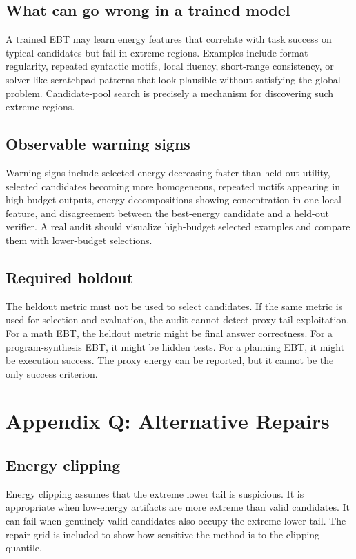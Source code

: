 \documentclass{article}
\begin{document}
\subsection{What can go wrong in a trained model}

A trained EBT may learn energy features that correlate with task success on
typical candidates but fail in extreme regions. Examples include format
regularity, repeated syntactic motifs, local fluency, short-range consistency,
or solver-like scratchpad patterns that look plausible without satisfying the
global problem. Candidate-pool search is precisely a mechanism for discovering
such extreme regions.

\subsection{Observable warning signs}

Warning signs include selected energy decreasing faster than held-out utility,
selected candidates becoming more homogeneous, repeated motifs appearing in
high-budget outputs, energy decompositions showing concentration in one local
feature, and disagreement between the best-energy candidate and a held-out
verifier. A real audit should visualize high-budget selected examples and
compare them with lower-budget selections.

\subsection{Required holdout}

The heldout metric must not be used to select candidates. If the same metric is
used for selection and evaluation, the audit cannot detect proxy-tail
exploitation. For a math EBT, the heldout metric might be final answer
correctness. For a program-synthesis EBT, it might be hidden tests. For a
planning EBT, it might be execution success. The proxy energy can be reported,
but it cannot be the only success criterion.

\section{Appendix Q: Alternative Repairs}

\subsection{Energy clipping}

Energy clipping assumes that the extreme lower tail is suspicious. It is
appropriate when low-energy artifacts are more extreme than valid candidates.
It can fail when genuinely valid candidates also occupy the extreme lower tail.
The repair grid is included to show how sensitive the method is to the clipping
quantile.
\end{document}
